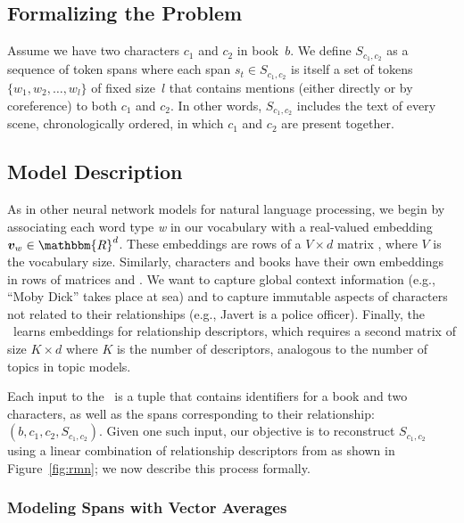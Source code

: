 \subsection{Formalizing the Problem}

Assume we have two characters $c_1$ and $c_2$ in book~$b$. We define
$S_{c_1, c_2}$ as a sequence of token spans where each span $s_t \in
S_{c_1, c_2}$ is itself a set of tokens $\{w_1, w_2, \dots, w_l\}$ of
fixed size~$l$ that contains mentions (either directly or by
coreference) to both $c_1$ and $c_2$. In other words, $S_{c_1, c_2}$
includes the text of every scene, chronologically ordered, in which
$c_1$ and $c_2$ are present together.

\subsection{Model Description}

As in other neural network models for natural language processing, we
begin by associating each word type \emph{w} in our vocabulary with a
real-valued embedding $\bvec{v}_w \in \mathbbm{R}^d$. These embeddings
are rows of a $V \times d$ matrix , where $V$ is the
vocabulary size. Similarly, characters and books have their own
embeddings in rows of matrices  and . We want
 to capture global context information (e.g., ``Moby Dick''
takes place at sea) and  to capture immutable aspects of
characters not related to their relationships (e.g., Javert is a
police officer). Finally, the \rmn\ learns embeddings for
relationship descriptors, which requires a second matrix  of
size $K \times d$ where $K$ is the number
of descriptors, analogous to the number of topics in topic models.

Each input to the \rmn\ is a tuple that contains identifiers for a book and two
characters, as well as the spans corresponding to their relationship: $(b, c_1,
c_2, S_{c_1,c_2})$. Given one such input, our objective is to reconstruct
$S_{c_1,c_2}$ using a linear combination of relationship descriptors from
 as shown in Figure~\ref{fig:rmn}; we now describe this process
formally.

\subsubsection{Modeling Spans with Vector Averages}

